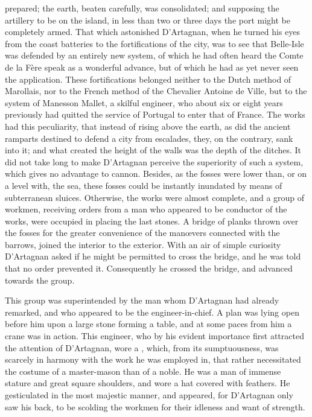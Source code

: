 prepared; the earth, beaten carefully, was consolidated; and supposing the artillery to be on the island, in less than two or three days the port might be completely armed. That which astonished D'Artagnan, when he turned his eyes from the coast batteries to the fortifications of the city, was to see that Belle-Isle was defended by an entirely new system, of which he had often heard the Comte de la Fère speak as a wonderful advance, but of which he had as yet never seen the application. These fortifications belonged neither to the Dutch method of Marollais, nor to the French method of the Chevalier Antoine de Ville, but to the system of Manesson Mallet, a skilful engineer, who about six or eight years previously had quitted the service of Portugal to enter that of France. The works had this peculiarity, that instead of rising above the earth, as did the ancient ramparts destined to defend a city from escalades, they, on the contrary, sank into it; and what created the height of the walls was the depth of the ditches. It did not take long to make D'Artagnan perceive the superiority of such a system, which gives no advantage to cannon. Besides, as the fosses were lower than, or on a level with, the sea, these fosses could be instantly inundated by means of subterranean sluices. Otherwise, the works were almost complete, and a group of workmen, receiving orders from a man who appeared to be conductor of the works, were occupied in placing the last stones. A bridge of planks thrown over the fosses for the greater convenience of the manœvers connected with the barrows, joined the interior to the exterior. With an air of simple curiosity D'Artagnan asked if he might be permitted to cross the bridge, and he was told that no order prevented it. Consequently he crossed the bridge, and advanced towards the group.

This group was superintended by the man whom D'Artagnan had already remarked, and who appeared to be the engineer-in-chief. A plan was lying open before him upon a large stone forming a table, and at some paces from him a crane was in action. This engineer, who by his evident importance first attracted the attention of D'Artagnan, wore a , which, from its sumptuousness, was scarcely in harmony with the work he was employed in, that rather necessitated the costume of a master-mason than of a noble. He was a man of immense stature and great square shoulders, and wore a hat covered with feathers. He gesticulated in the most majestic manner, and appeared, for D'Artagnan only saw his back, to be scolding the workmen for their idleness and want of strength.

